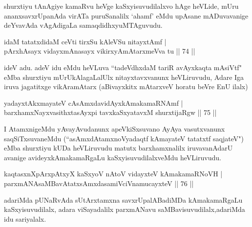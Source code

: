 \begin{artha}
shurxtiyu tAnAgiye kamaRvu heVge kaSxyisuvudilalxvo hAge heVLide, mUru ananxsavxrUpanAda virATa puruSanalilx `ahamf' eMdu upAsane mADuvavanige deYvavAda vAgAdigaLa samaqdidhxyuMTAguvudu.
\end{artha}


\begin{shl}
idaM tatatxdidaM ceVti tirxSu kAleVSu nitayxtAmf |\\
pArxhAsayx vidayxmAnasayx vikirxyAmAtarxmeVva tu \hfill || 74 ||
\end{shl}

\begin{artha}
ideV adu. adeV idu eMdu heVLuva ``tadeVdhxdaM tariR avAyxkaqta mAsiVtf" eMba shurxtiyu mUrUkAlagaLalUlx nitayxtavxvanunx heVLiruvudu, Adare Iga iruva jagatitxge vikAramAtarx (aBivayxkitx mAtarxveV horatu beVre EnU ilalx)
\end{artha}

\begin{shl}
yadayxtAkxmayateV cAsAmxdavidAyxkAmakamaRNAmf |\\
barxhamxNayxvasithxtasAyxpi tavxkaSxyatavxM shurxtijaRgw \hfill || 75 ||
\end{shl}

\begin{artha}
I AtamxnigeMdu yAvayAvudanunx apeVkiSxsuvano AyAya vasutxvanunx saqSiTxsuvaneMdu (``asAmxdAtamxnoVyadaqtf kAmayateV tatatxtf saqjateV") eMba shurxtiyu kUDa heVLiruvudu matutx barxhamxnalilx iruvavanAdarU avanige avideyxkAmakamaRgaLu kaSxyisuvudilalxveMdu heVLiruvudu.
\end{artha}


\begin{shl}
kaqtasxnXpArxpAtxyX kaSxyoV nAtoV vidayxteV kAmakamaRNoVH |\\
parxmANAsaMBavAtatxsAmxdasamiVciVnamucayxteV \hfill || 76 ||
\end{shl}

\begin{artha}
adariMda pUNaRvAda sUtArxtamxna savxrUpalABadiMDa kAmakamaRgaLu kaSxyisuvudilalx, adara viSayadalilx parxmANavu saMBavisuvudilalx,adariMda idu sariyalalx.
\end{artha}


